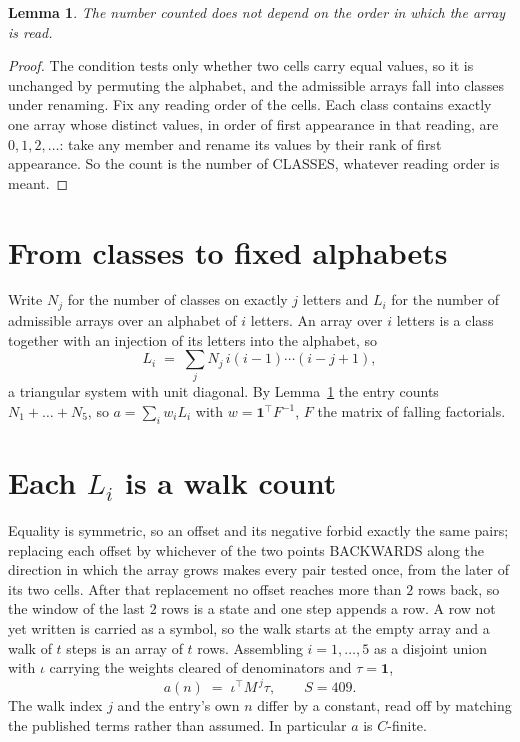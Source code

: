 \documentclass[11pt,a4paper]{article}
\theoremstyle{plain}
\newtheorem{lemma}[theorem]{Lemma}
\theoremstyle{definition}
\begin{document}
\begin{lemma}\label{lem:order}
The number counted does not depend on the order in which the array is read.
\end{lemma}

\begin{proof}
The condition tests only whether two cells carry equal values, so it is unchanged by permuting
the alphabet, and the admissible arrays fall into classes under renaming. Fix any reading order
of the cells. Each class contains exactly one array whose distinct values, in order of first
appearance in that reading, are $0,1,2,\dots$: take any member and rename its values by their
rank of first appearance. So the count is the number of CLASSES, whatever reading order is
meant.
\end{proof}

\section{From classes to fixed alphabets}

Write $N_j$ for the number of classes on exactly $j$ letters and $L_i$ for the number of
admissible arrays over an alphabet of $i$ letters. An array over $i$ letters is a class together
with an injection of its letters into the alphabet, so
\[
L_i\;=\;\sum_j N_j\,i(i-1)\cdots(i-j+1),
\]
a triangular system with unit diagonal. By Lemma~\ref{lem:order} the entry counts
$N_1+\dots+N_{5}$, so $a=\sum_i w_iL_i$ with $w=\mathbf{1}^{\!\top}F^{-1}$, $F$ the
matrix of falling factorials.

\section{Each $L_i$ is a walk count}

Equality is symmetric, so an offset and its negative forbid exactly the same pairs; replacing
each offset by whichever of the two points BACKWARDS along the direction in which the array
grows makes every pair tested once, from the later of its two cells. After that replacement no
offset reaches more than $2$ rows back, so the window of the last $2$
rows is a state and one step appends a row. A row not yet written is
carried as a symbol, so the walk starts at the empty array and a walk of $t$ steps is an array
of $t$ rows. Assembling $i=1,\dots,5$ as a disjoint union with $\iota$ carrying the
weights cleared of denominators and $\tau=\mathbf{1}$,
\[
a(n)\;=\;\iota^{\!\top}M^{\,j}\tau ,\qquad S=409.
\]
The walk index $j$ and the entry's own $n$ differ by a constant, read off by matching the
published terms rather than assumed. In particular $a$ is $C$-finite.
\end{document}
